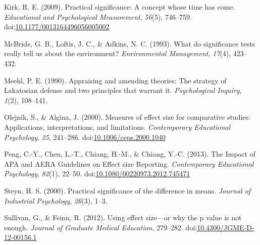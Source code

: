 \documentclass[man]{apa6}
\begin{document}
\leavevmode\hypertarget{ref-Kirk_2009}{}%
Kirk, R. E. (2009). Practical significance: A concept whose time has come. \emph{Educational and Psychological Measurement}, \emph{56}(5), 746--759. doi:\href{https://doi.org/10.1177/0013164496056005002\%20}{10.1177/0013164496056005002 }

\leavevmode\hypertarget{ref-McBride_et_al_1993}{}%
McBride, G. B., Loftis, J. C., \& Adkins, N. C. (1993). What do significance tests really tell us about the environment? \emph{Environmental Management}, \emph{17}(4), 423--432.

\leavevmode\hypertarget{ref-Meehl_1990}{}%
Meehl, P. E. (1990). Appraising and amending theories: The strategy of Lakatosian defense and two principles that warrant it. \emph{Psychological Inquiry}, \emph{1}(2), 108--141.

\leavevmode\hypertarget{ref-Olejnik_Algina_2000}{}%
Olejnik, S., \& Algina, J. (2000). Measures of effect size for comparative studies: Applications, interpretations, and limitations. \emph{Contemporary Educational Psychology}, \emph{25}, 241--286. doi:\href{https://doi.org/10.1006/ceps.2000.1040}{10.1006/ceps.2000.1040}

\leavevmode\hypertarget{ref-Peng_et_al_2013}{}%
Peng, C.-Y., Chen, L.-T., Chiang, H.-M., \& Chiang, Y.-C. (2013). The Impact of APA and AERA Guidelines on Effect size Reporting. \emph{Contemporary Educational Psychology}, \emph{82}(1), 22--50. doi:\href{https://doi.org/10.1080/00220973.2012.745471}{10.1080/00220973.2012.745471}

\leavevmode\hypertarget{ref-Steyn_2000}{}%
Steyn, H. S. (2000). Practical significance of the difference in means. \emph{Journal of Industrial Psychology}, \emph{26}(3), 1--3.

\leavevmode\hypertarget{ref-Sullivan_Feinn_2012}{}%
Sullivan, G., \& Feinn, R. (2012). Using effect size---or why the p value is not enough. \emph{Journal of Graduate Medical Education}, 279--282. doi:\href{https://doi.org/10.4300/JGME-D-12-00156.1}{10.4300/JGME-D-12-00156.1}
\end{document}
